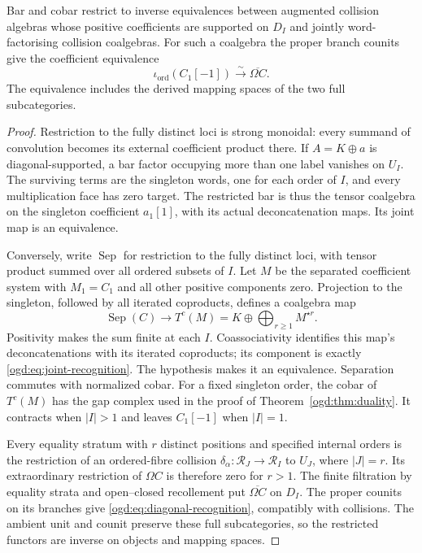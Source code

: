 \begin{theorem}\label{ogd:thm:joint-recognition}
Bar and cobar restrict to inverse equivalences between augmented collision
algebras whose positive coefficients are supported on $D_I$ and jointly
word-factorising collision coalgebras. For such a coalgebra the proper
branch counits give the coefficient equivalence
\begin{equation}\label{ogd:eq:diagonal-recognition}
 \iota_{\mathrm{ord}}(C_1[-1])\xrightarrow{\sim}\overline{\Omega C}.
\end{equation}
The equivalence includes the derived mapping spaces of the two full
subcategories.
\end{theorem}

\begin{proof}
Restriction to the fully distinct loci is strong monoidal: every summand
of convolution becomes its external coefficient product there.
If $A=K\oplus a$ is diagonal-supported, a bar factor occupying more than
one label vanishes on $U_I$. The surviving terms are the singleton words,
one for each order of $I$, and every multiplication face has zero target.
The restricted bar is thus the tensor coalgebra on the singleton coefficient
$a_1[1]$, with its actual deconcatenation maps. Its joint map is an equivalence.

Conversely, write $\operatorname{Sep}$ for restriction to the fully distinct
loci, with tensor product summed over all ordered subsets of $I$.
Let $M$ be the separated coefficient system with $M_1=C_1$
and all other positive components zero. Projection to the singleton,
followed by all iterated coproducts, defines a coalgebra map
\[
 \operatorname{Sep}(C)\longrightarrow
 T^c(M)=K\oplus\bigoplus_{r\geq1}M^{\star r}.
\]
Positivity makes the sum finite at each $I$.
Coassociativity identifies this map's deconcatenations
with its iterated coproducts; its component is exactly
\eqref{ogd:eq:joint-recognition}. The hypothesis makes it an equivalence.
Separation commutes with normalized cobar. For a fixed singleton order,
the cobar of $T^c(M)$ has the gap complex used in the proof of
Theorem~\ref{ogd:thm:duality}. It contracts when $|I|>1$ and leaves
$C_1[-1]$ when $|I|=1$.

Every equality stratum with $r$ distinct positions and specified internal
orders is the restriction of an ordered-fibre collision
$\delta_\alpha:\mathscr R_J\to\mathscr R_I$ to $U_J$, where $|J|=r$.
Its extraordinary restriction of $\Omega C$ is therefore zero for $r>1$.
The finite filtration by equality strata and open--closed recollement
put $\overline{\Omega C}$ on $D_I$. The proper counits on its branches
give \eqref{ogd:eq:diagonal-recognition}, compatibly with collisions.
The ambient unit and counit preserve these full subcategories, so the
restricted functors are inverse on objects and mapping spaces.
\end{proof}

